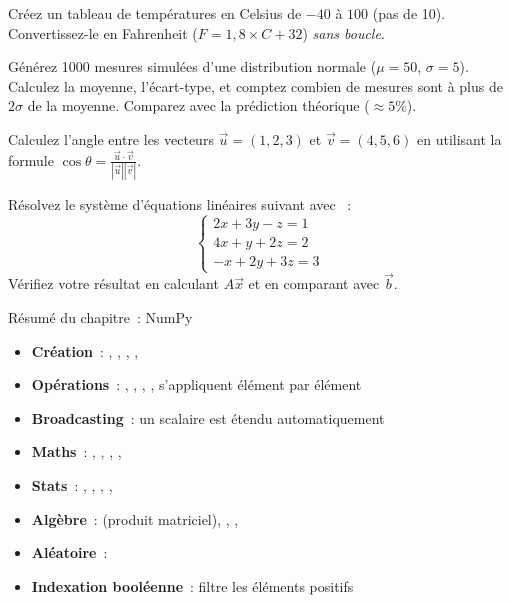 \begin{exercice}
Cr\'eez un tableau de temp\'eratures en Celsius de $-40$ \`a $100$ (pas de 10).
Convertissez-le en Fahrenheit ($F = 1{,}8 \times C + 32$) \emph{sans boucle}.
\end{exercice}

\begin{exercice}
G\'en\'erez 1000 mesures simul\'ees d'une distribution normale ($\mu = 50$, $\sigma = 5$).
Calculez la moyenne, l'\'ecart-type, et comptez combien de mesures sont \`a plus de
$2\sigma$ de la moyenne. Comparez avec la pr\'ediction th\'eorique ($\approx 5\%$).
\end{exercice}

\begin{exercice}
Calculez l'angle entre les vecteurs $\vec{u} = (1, 2, 3)$ et $\vec{v} = (4, 5, 6)$
en utilisant la formule $\cos\theta = \frac{\vec{u}\cdot\vec{v}}{|\vec{u}||\vec{v}|}$.
\end{exercice}

\begin{exercice}
R\'esolvez le syst\`eme d'\'equations lin\'eaires suivant avec ~:
\[
\begin{cases}
2x + 3y - z = 1 \\
4x + y + 2z = 2 \\
-x + 2y + 3z = 3
\end{cases}
\]
V\'erifiez votre r\'esultat en calculant $A\vec{x}$ et en comparant avec $\vec{b}$.
\end{exercice}

\begin{formules}{R\'esum\'e du chapitre~: NumPy}
\begin{itemize}
    \item \textbf{Cr\'eation}~: , , ,
    , 
    \item \textbf{Op\'erations}~: \py{+}, \py{-}, \py{*}, \py{/}, \py{**}
    s'appliquent \'el\'ement par \'el\'ement
    \item \textbf{Broadcasting}~: un scalaire est \'etendu automatiquement
    \item \textbf{Maths}~: , , , , 
    \item \textbf{Stats}~: , , , , 
    \item \textbf{Alg\`ebre}~:  (produit matriciel), ,
    , 
    \item \textbf{Al\'eatoire}~: 
    \item \textbf{Indexation bool\'eenne}~:  filtre les \'el\'ements positifs
\end{itemize}
\end{formules}
